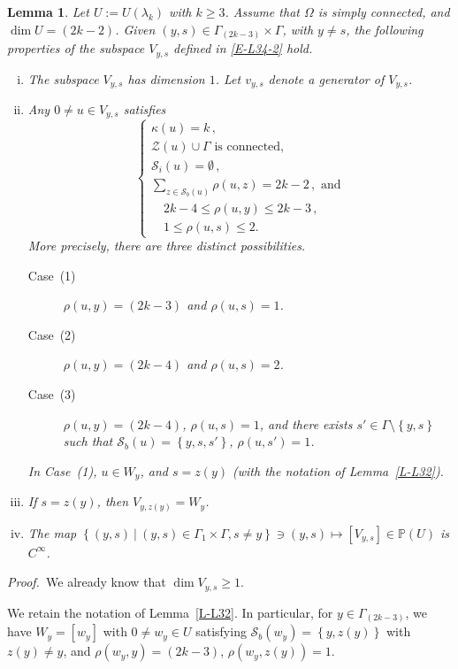 \documentclass[12pt,a4paper]{amsart}
\theoremstyle{plain} %
\newtheorem{lemma}[theorem]{Lemma}
\theoremstyle{definition}
\numberwithin{equation}{section}
\numberwithin{figure}{section}
\numberwithin{table}{section}
\newcommand{\bP}{\mathbb{P}}
\newcommand{\cS}{\mathcal{S}}
\newcommand{\cZ}{\mathcal{Z}}
\newcommand{\pf}{\emph{Proof.~}}
\newcommand{\sm}{\!\setminus\!}
\newcommand{\set}[1]{\left\lbrace #1 \right\rbrace}
\begin{document}
\begin{lemma}\label{L-L34a}
 Let $U:=U(\lambda_k)$ with $k \ge 3$. Assume that $\Omega$ is simply connected, and $\dim U = (2k-2)$. Given $(y,s) \in \Gamma_{(2k -3)} \times \Gamma $, with $ y \neq s$,  the following properties of the subspace $V_{y,s}$ defined in \eqref{E-L34-2} hold.
\begin{enumerate}[(i)]
  \item The subspace $V_{y,s}$ has dimension $1$. Let $v_{y,s}$ denote a generator of $V_{y,s}$.
  \item Any $0 \neq u \in V_{y,s}$ satisfies
  \begin{equation}\label{E-L34-4}
  \left\{
  \begin{array}{l}
  \kappa(u) = k\,,\\[5pt]
  \cZ(u) \cup \Gamma  \text{~is connected,}\\[5pt]
  \cS_i(u) = \emptyset\,,\\[5pt]
  \sum_{z \in \cS_b(u)} \rho(u,z) = 2k-2\,, \text{~and}\\[5pt]
  \quad 2k-4 \le \rho(u,y) \le 2k-3\,,\\[5pt]
  \quad 1 \le \rho(u,s) \le 2.
  \end{array}
  \right.
  \end{equation}
  More precisely, there are three distinct possibilities.
  \begin{description}
    \item[Case~(1)] $\rho(u,y) = (2k-3)$ and $\rho(u,s) = 1$.
    \item[Case~(2)] $\rho(u,y) = (2k-4)$ and $\rho(u,s) = 2$.
    \item[Case~(3)] $\rho(u,y) = (2k-4)$, $\rho(u,s) = 1$, and there exists $s' \in \Gamma  \sm \set{y,s}$ such that $\cS_b(u) = \set{y,s,s'}$, $\rho(u,s') = 1$.
  \end{description}
  In Case~(1), $u \in W_y$,  and $s = z(y)$ (with the notation of Lemma~\ref{L-L32}).
  \item If $s = z(y)$, then $V_{y,z(y)} = W_y$.
  \item The map $\set{(y,s) ~|~ (y,s) \in \Gamma_{1}\times \Gamma , s\neq y} \ni (y,s) \mapsto [V_{y,s}] \in \bP(U)$ is $C^{\infty}$.
  \end{enumerate}
\end{lemma}%

\pf  We already know that $\dim V_{y,s} \ge 1$. \smallskip

We retain the notation of Lemma~\ref{L-L32}. In particular, for $y \in \Gamma_{(2k -3)}$, we have $W_y = [w_y]$ with $0 \neq w_y \in U$ satisfying $\cS_b(w_y) = \set{y,z(y)}$ with $z(y) \neq y$, and $\rho(w_y,y) = (2k-3)$, $\rho(w_y,z(y)) = 1$. \smallskip
\end{document}
